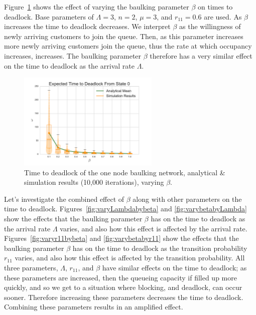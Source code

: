 \documentclass{article}
\begin{document}
Figure~\ref{fig:varybeta} shows the effect of varying the baulking parameter $\beta$ on times to deadlock.
Base parameters of $\Lambda = 3$, $n = 2$, $\mu = 3$, and $r_{11} = 0.6$ are used.
As $\beta$ increases the time to deadlock decreases.
We interpret $\beta$ as the willingness of newly arriving customers to join the queue.
Then, as this parameter increases more newly arriving customers join the queue, thus the rate at which occupancy increases, increases.
The baulking parameter $\beta$ therefore has a very similar effect on the time to deadlock as the arrival rate $\Lambda$.

\begin{figure}[!hbtp]
    \begin{center}
        \includegraphics[width=0.6\textwidth]{img/vary_beta.pdf}
    \end{center}
    \caption{Time to deadlock of the one node baulking network, analytical \& simulation results (10,000 iterations), varying $\beta$.}
    \label{fig:varybeta}
\end{figure}

Let's investigate the combined effect of $\beta$ along with other parameters on the time to deadlock.
Figures~\ref{fig:varyLambdabybeta} and \ref{fig:varybetabyLambda} show the effects that the baulking parameter $\beta$ has on the time to deadlock as the arrival rate $\Lambda$ varies, and also how this effect is affected by the arrival rate.
Figures~\ref{fig:varyr11bybeta} and \ref{fig:varybetabyr11} show the effects that the baulking parameter $\beta$ has on the time to deadlock as the transition probability $r_{11}$ varies, and also how this effect is affected by the transition probability.
All three parameters, $\Lambda$, $r_{11}$, and $\beta$ have similar effects on the time to deadlock; as these parameters are increased, then the queueing capacity if filled up more quickly, and so we get to a situation where blocking, and deadlock, can occur sooner.
Therefore increasing these parameters decreases the time to deadlock.
Combining these parameters results in an amplified effect.
\end{document}

